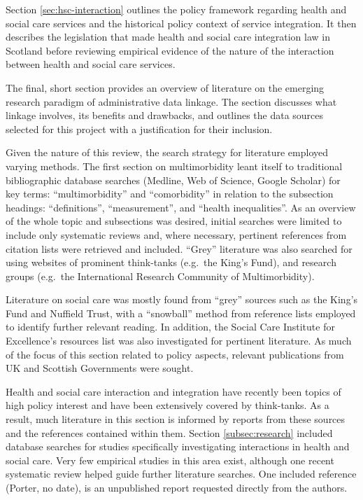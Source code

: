\documentclass[12pt,a4paper,oneside,table]{report}
\begin{document}
Section \ref{sec:hsc-interaction} outlines the policy framework
regarding health and social care services and the historical policy
context of service integration. It then describes the legislation that
made health and social care integration law in Scotland before reviewing
empirical evidence of the nature of the interaction between health and
social care services.

The final, short section provides an overview of literature on the
emerging research paradigm of administrative data linkage. The section
discusses what linkage involves, its benefits and drawbacks, and
outlines the data sources selected for this project with a justification
for their inclusion.

Given the nature of this review, the search strategy for literature
employed varying methods. The first section on multimorbidity leant
itself to traditional bibliographic database searches (Medline, Web of
Science, Google Scholar) for key terms: ``multimorbidity'' and
``comorbidity'' in relation to the subsection headings: ``definitions'',
``measurement'', and ``health inequalities''. As an overview of the
whole topic and subsections was desired, initial searches were limited
to include only systematic reviews and, where necessary, pertinent
references from citation lists were retrieved and included. ``Grey''
literature was also searched for using websites of prominent think-tanks
(e.g.~the King's Fund), and research groups (e.g.~the International
Research Community of Multimorbidity).

Literature on social care was mostly found from ``grey'' sources such as
the King's Fund and Nuffield Trust, with a ``snowball'' method from
reference lists employed to identify further relevant reading. In
addition, the Social Care Institute for Excellence's resources list was
also investigated for pertinent literature. As much of the focus of this
section related to policy aspects, relevant publications from UK and
Scottish Governments were sought.

Health and social care interaction and integration have recently been
topics of high policy interest and have been extensively covered by
think-tanks. As a result, much literature in this section is informed by
reports from these sources and the references contained within them.
Section \ref{subsec:research} included database searches for studies
specifically investigating interactions in health and social care. Very
few empirical studies in this area exist, although one recent systematic
review helped guide further literature searches. One included reference
(Porter, no date), is an unpublished report requested directly from the
authors.
\end{document}
